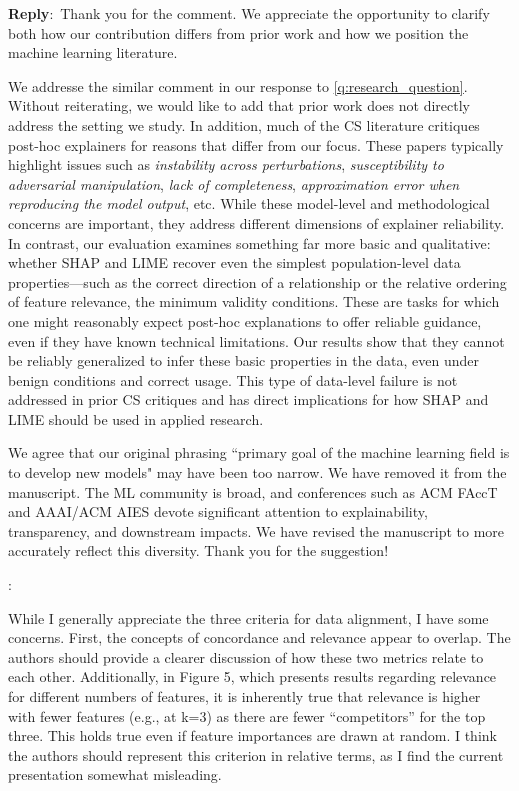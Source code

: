 \documentclass[11pt]{article}
\newcounter{se}[section]
\newcounter{reviewer}
\newcounter{point}[reviewer]
\renewcommand{\thepoint}{R\,\thereviewer.\arabic{point}}
\newenvironment{point}{
    \refstepcounter{point} \bigskip \noindent {\textbf{\thepoint}}: \rmfamily \itshape
}{\medskip}
\newenvironment{reply}
 {\par\medskip \noindent \begin{sf}\textbf{Reply}:\ }
 {\medskip \end{sf}}
\begin{document}
\begin{reply}Thank you for the comment. We appreciate the opportunity to clarify both how our contribution differs from prior work and how we position the machine learning literature.

We addresse the similar comment in our response to \ref{q:research_question}. Without reiterating, we would like to add that prior work does not directly address the setting we study.
In addition, much of the CS literature critiques post-hoc explainers for reasons that differ from our focus. These papers typically highlight issues such as \emph{instability across perturbations}, \emph{susceptibility to adversarial manipulation}, \emph{lack of completeness}, \emph{approximation error when reproducing the model output}, etc. While these model-level and methodological concerns are important, they address different dimensions of explainer reliability. In contrast, our evaluation examines something far more basic and qualitative: whether SHAP and LIME recover even the simplest population-level data properties—such as the correct direction of a relationship or the relative ordering of feature relevance, the minimum validity conditions. These are tasks for which one might reasonably expect post-hoc explanations to offer reliable guidance, even if they have known technical limitations. Our results show that they cannot be reliably generalized to infer these basic properties in the data, even under benign conditions and correct usage. This type of data-level failure is not addressed in prior CS critiques and has direct implications for how SHAP and LIME should be used in applied research.

We agree that our original phrasing “primary goal of the machine learning field is to develop new models" may have been too narrow. We have removed it from the manuscript. The ML community is broad, and conferences such as ACM FAccT and AAAI/ACM AIES devote significant attention to explainability, transparency, and downstream impacts. We have revised the manuscript to more accurately reflect this diversity. Thank you for the suggestion!
\end{reply}

\begin{point}
While I generally appreciate the three criteria for data alignment, I have some concerns. First, the concepts of concordance and relevance appear to overlap. The authors should provide a clearer discussion of how these two metrics relate to each other. Additionally, in Figure 5, which presents results regarding relevance for different numbers of features, it is inherently true that relevance is higher with fewer features (e.g., at k=3) as there are fewer “competitors” for the top three. This holds true even if feature importances are drawn at random. I think the authors should represent this criterion in relative terms, as I find the current presentation somewhat misleading.
\end{point}
\end{document}
